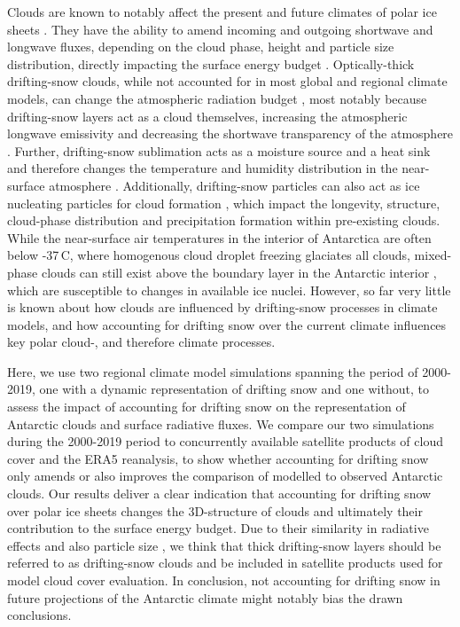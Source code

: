 \documentclass[draft]{agujournal2019}
\begin{document}
Clouds are known to notably affect the present and future climates of polar ice sheets \cite{Gilbert2020,Gorodetskaya2015,Lachlan2010,Hofer2017, Hofer2019,Hahn2019}. They have the ability to amend incoming and outgoing shortwave and longwave fluxes, depending on the cloud phase, height and particle size distribution, directly impacting the surface energy budget \cite{Gilbert2020,Tan2016,Tan2019}. Optically-thick drifting-snow clouds, while not accounted for in most global and regional climate models, can change the atmospheric radiation budget \cite{Letoumelin2020}, most notably because drifting-snow layers act as a cloud themselves, increasing the atmospheric longwave emissivity and decreasing the shortwave transparency of the atmosphere \cite{Yang2013, Yamanouchi1984, Letoumelin2020, Lawson2006}. Further, drifting-snow sublimation acts as a moisture source and a heat sink and therefore changes the temperature and humidity distribution in the near-surface atmosphere \cite{Amory2019}. Additionally, drifting-snow particles can also act as ice nucleating particles for cloud formation \cite{Geerts2015}, which impact the longevity, structure, cloud-phase distribution and precipitation formation within pre-existing clouds. While the near-surface air temperatures in the interior of Antarctica are often below -37\,\textdegree C, where homogenous cloud droplet freezing glaciates all clouds, mixed-phase clouds can still exist above the boundary layer in the Antarctic interior \cite{Lawson2014}, which are susceptible to changes in available ice nuclei. However, so far very little is known about how clouds are influenced by drifting-snow processes in climate models, and how accounting for drifting snow over the current climate influences key polar cloud-, and therefore climate processes.

Here, we use two regional climate model simulations spanning the period of 2000-2019, one with a dynamic representation of drifting snow and one without, to assess the impact of accounting for drifting snow on the representation of Antarctic clouds and surface radiative fluxes. We compare our two simulations during the 2000-2019 period to concurrently available satellite products of cloud cover and the ERA5 reanalysis, to show whether accounting for drifting snow only amends or also improves the comparison of modelled to observed Antarctic clouds. Our results deliver a clear indication that accounting for drifting snow over polar ice sheets changes the 3D-structure of clouds and ultimately their contribution to the surface energy budget. Due to their similarity in radiative effects and also particle size \cite{Lawson2006}, we think that thick drifting-snow layers should be referred to as drifting-snow clouds and be included in satellite products used for model cloud cover evaluation. In conclusion, not accounting for drifting snow in future projections of the Antarctic climate might notably bias the drawn conclusions.
\end{document}
